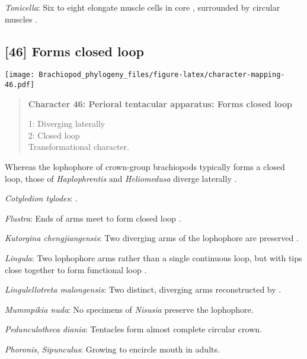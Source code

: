 \documentclass[openany]{book}
\theoremstyle{definition}
\theoremstyle{definition}
\theoremstyle{definition}
\theoremstyle{remark}
\begin{document}
\hypertarget{Tonicella-coding-45}{}
\emph{Tonicella}: Six to eight elongate muscle cells in core
\citep{Shimek1988}, surrounded by circular muscles \citep{Byrum1994}.

\subsection*{{[}46{]} Forms closed loop}\label{forms-closed-loop}

\texttt{[image: Brachiopod\_phylogeny\_files/figure-latex/character-mapping-46.pdf]}

\begin{quote}
\textbf{Character 46: Perioral tentacular apparatus: Forms closed loop}

1: Diverging laterally\\
2: Closed loop\\
Transformational character.
\end{quote}

Whereas the lophophore of crown-group brachiopods typically forms a
closed loop, those of \emph{Haplophrentis} and \emph{Heliomedusa}
diverge laterally \citep{Moysiuk2017Hyolithsare}.

\hypertarget{Cotyledion_tylodes-coding-46}{}
\emph{Cotyledion tylodes}: \citet{Nielsen1966}.

\hypertarget{Flustra-coding-46}{}
\emph{Flustra}: Ends of arms meet to form closed loop
\citep{Temereva2016Thenervous}.

\hypertarget{Kutorgina_chengjiangensis-coding-46}{}
\emph{Kutorgina chengjiangensis}: Two diverging arms of the lophophore
are preserved \citep{Balthasar2009EarlyCambrian}.

\hypertarget{Lingula-coding-46}{}
\emph{Lingula}: Two lophophore arms rather than a single continuous
loop, but with tips close together to form functional loop
\citep{Torrey1901}.

\hypertarget{Lingulellotreta_malongensis-coding-46}{}
\emph{Lingulellotreta malongensis}: Two distinct, diverging arms
reconstructed by \citet{Zhang2007Agregarious}.

\hypertarget{Mummpikia_nuda-coding-46}{}
\emph{Mummpikia nuda}: No specimens of \emph{Nisusia} preserve the
lophophore.

\hypertarget{Pedunculotheca_diania-coding-46}{}
\emph{Pedunculotheca diania}: Tentacles form almost complete circular
crown.

\hypertarget{Phoronis-coding-46}{}
\emph{Phoronis}, \emph{Sipunculus}: Growing to encircle mouth in adults.
\end{document}
